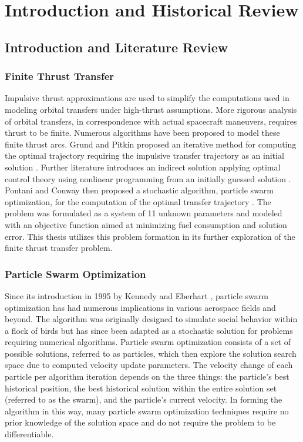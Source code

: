 \chapter{Introduction and Historical Review}
\newpage

\section{Introduction and Literature Review}

\subsection{Finite Thrust Transfer}

Impulsive thrust approximations are used to simplify the computations used in modeling orbital transfers under high-thrust assumptions.
More rigorous analysis of orbital transfers, in correspondence with actual spacecraft maneuvers, requires thrust to be finite. Numerous algorithms have been
proposed to model these finite thrust arcs. Grund and Pitkin proposed an iterative method for computing the optimal trajectory requiring the impulsive transfer trajectory as
an initial solution \citep{Fthrust1}. Further literature introduces an indirect solution applying optimal control theory using nonlinear programming from an initially guessed
solution \citep{Fthrust2}. Pontani and Conway then proposed a stochastic algorithm, particle swarm optimization, for the computation of the optimal transfer trajectory \citep{Pontani_Conway}. The problem was formulated as 
a system of 11 unknown parameters and modeled with an objective function aimed at minimizing fuel consumption
and solution error. This thesis utilizes this problem formation in its further exploration of the finite thrust transfer problem.

\subsection{Particle Swarm Optimization}

Since its introduction in 1995 by Kennedy and Eberhart \citep{Initial_PSO}, particle swarm optimization has had numerous implications in various aerospace fields and beyond.
The algorithm was originally designed to simulate social behavior within a flock of birds but has since been adapted as a stochastic solution for problems
requiring numerical algorithms. Particle swarm optimization consists of a set of possible solutions, referred to as particles, which then explore the solution search space due to
computed velocity update parameters. The velocity change of each particle per algorithm iteration depends on the three things: the particle's best historical position, the best historical
solution within the entire solution set (referred to as the swarm), and the particle's current velocity. In forming the algorithm in this way, many particle swarm optimization techniques 
require no prior knowledge of the solution space and do not require the problem to be differentiable.

